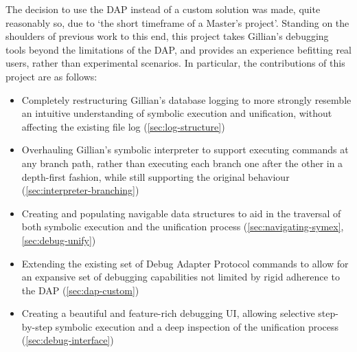 The decision to use the DAP instead of a custom solution was made, quite
reasonably so, due to `the short timeframe of a Master's project'. Standing on
the shoulders of previous work to this end, this project takes Gillian's
debugging tools beyond the limitations of the DAP, and provides an experience
befitting real users, rather than experimental scenarios. In particular, the
contributions of this project are as follows:
\begin{itemize}
  \item Completely restructuring Gillian's database logging to more strongly
        resemble an intuitive understanding of symbolic execution and
        unification, without affecting the existing file log
        (\autoref{sec:log-structure})
  \item Overhauling Gillian's symbolic interpreter to support executing commands
        at any branch path, rather than executing each branch one after the
        other in a depth-first fashion, while still supporting the original
        behaviour (\autoref{sec:interpreter-branching})
  \item Creating and populating navigable data structures to aid in the
        traversal of both symbolic execution and the unification process
        (\autoref{sec:navigating-symex}, \autoref{sec:debug-unify})
  \item Extending the existing set of Debug Adapter Protocol commands to allow
        for an expansive set of debugging capabilities not limited by rigid
        adherence to the DAP (\autoref{sec:dap-custom})
  \item Creating a beautiful and feature-rich debugging UI, allowing selective
        step-by-step symbolic execution and a deep inspection of the unification
        process (\autoref{sec:debug-interface})
\end{itemize}
